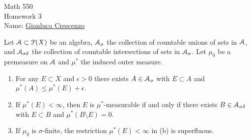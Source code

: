 \documentclass[10pt,twoside,openany]{memoir}
\begin{document}
\begin{center}
    {\Large Math 550 \\[0.1in]Homework 3}\\[.175in]
    {Name:} {\underline{Gianluca Crescenzo\hspace*{2in}}}\\[0.15in]
    \end{center}
    \vspace{4pt}
\begin{exercise}
Let $\mathcal{A} \subset \mathcal{P}(X)$ be an algebra, $\mathcal{A}_\sigma$ the collection of countable unions of sets in $\mathcal{A}$, and $\mathcal{A}_{\sigma\delta}$ the collection of countable intersections of sets in $\mathcal{A}_\sigma$. Let $\mu_0$ be a premeasure on $\mathcal{A}$ and $\mu^\ast$ the induced outer measure.
    \begin{enumerate}[label = (\alph*),itemsep=1pt,topsep=3pt]
        \item For any $E \subset X$ and $\epsilon > 0$ there exists $A \in \mathcal{A}_\sigma$ with $E \subset A$ and $\mu^\ast(A) \leq \mu^\ast(E) + \epsilon$.
        \item If $\mu^\ast(E) < \infty$, then $E$ is $\mu^\ast$-measurable if and only if there exists $B \in \mathcal{A}_{\sigma\delta}$ with $E \subset B$ and $\mu^\ast(B \setminus E) = 0$.
        \item If $\mu_0$ is $\sigma$-finite, the restriction $\mu^\ast(E) < \infty$ in (b) is superfluous.
    \end{enumerate}
\end{exercise}
\end{document}
